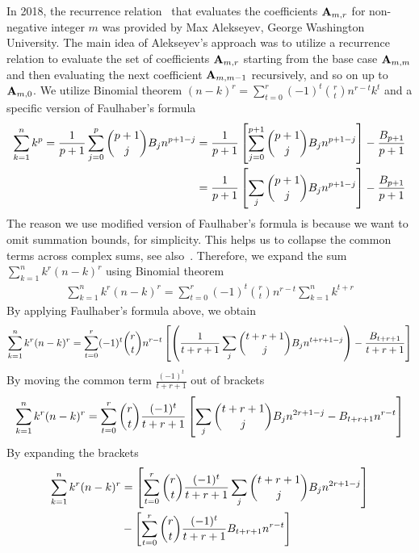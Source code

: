 In 2018, the recurrence relation~\cite{alekseyev2018mathoverflow} that evaluates the coefficients ${\mathbf{A}} \sb{m,r}$ for
non-negative integer $m$ was provided by Max Alekseyev, George Washington University.
The main idea of Alekseyev's approach was to utilize a recurrence relation to evaluate the set of coefficients ${\mathbf{A}} \sb{m,r}$
starting from the base case ${\mathbf{A}} \sb{m,m}$ and then evaluating the next coefficient ${\mathbf{A}} \sb{m,m-1}$
recursively, and so on up to ${\mathbf{A}} \sb{m,0}$.
We utilize Binomial theorem $(n-k)^r=\sum_{t=0}^{r} (-1)^t \binom{r}{t} n^{r-t} k^t$ and a specific version
of Faulhaber's formula~\cite{beardon1996sums}
\begin{align*}
    \sum_{k=1}^{n} k^{p}
    = \frac{1}{p+1}\sum_{j=0}^{p} \binom{p+1}{j} {B}\sb{j} n^{p+1-j}
    &= \frac{1}{p+1} \left[ \sum_{j=0}^{p+1} \binom{p+1}{j} {B}\sb{j} n^{p+1-j} \right] - \frac{{B}\sb{p+1}}{p+1} \\
    &= \frac{1}{p+1} \left[ \sum_{j} \binom{p+1}{j} {B}\sb{j} n^{p+1-j} \right] - \frac{{B}\sb{p+1}}{p+1}
\end{align*}
The reason we use modified version of Faulhaber's formula is because we want to omit summation bounds, for simplicity.
This helps us to collapse the common terms across complex sums, see also~\cite[~p. 2]{knuth1992two}.
Therefore, we expand the sum $\sum_{k=1}^{n} k^{r} (n-k)^{r}$ using Binomial theorem
\begin{align*}
    \sum_{k=1}^{n} k^{r} (n-k)^{r} = \sum_{t=0}^{r} (-1)^t \binom{r}{t} n^{r-t} \sum_{k=1}^{n} k^{t+r}
\end{align*}
By applying Faulhaber's formula above, we obtain
\begin{align*}
    \sum_{k=1}^{n} k^{r} (n-k)^{r}
    = \sum_{t=0}^{r} (-1)^t \binom{r}{t} n^{r-t} \left[ \left( \frac{1}{t+r+1} \sum_{j} \binom{t+r+1}{j} {B}\sb{j} n^{t+r+1-j} \right) - \frac{{B}\sb{t+r+1}}{t+r+1} \right]
\end{align*}
By moving the common term $\frac{(-1)^t}{t+r+1}$ out of brackets
\begin{align*}
    \sum_{k=1}^{n} k^{r} (n-k)^{r}
    = \sum_{t=0}^{r} \binom{r}{t} \frac{(-1)^t}{t+r+1} \left[ \sum_{j} \binom{t+r+1}{j} {B}\sb{j} n^{2r+1-j} - {B}\sb{t+r+1} n^{r-t} \right]
\end{align*}
By expanding the brackets
\begin{align*}
    \sum_{k=1}^{n} k^{r} (n-k)^{r}
    &= \left[ \sum_{t=0}^{r} \binom{r}{t} \frac{(-1)^t}{t+r+1} \sum_{j} \binom{t+r+1}{j} {B}\sb{j} n^{2r+1-j}  \right] \\
    &- \left[ \sum_{t=0}^{r} \binom{r}{t} \frac{(-1)^t}{t+r+1} {B}\sb{t+r+1} n^{r-t} \right]
\end{align*}

